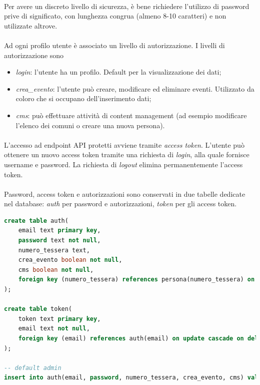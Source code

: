 \documentclass[11pt,a4paper,english]{article}
\begin{document}
\paragraph{} Per avere un discreto livello di sicurezza, è bene richiedere l'utilizzo di password prive di significato, con lunghezza congrua (almeno 8-10 caratteri) e non utilizzate altrove. 

\paragraph{} Ad ogni profilo utente è associato un livello di autorizzazione. I livelli di autorizzazione sono\begin{itemize}
    \item \emph{login}: l'utente ha un profilo. Default per la visualizzazione dei dati;
    \item \emph{crea\_evento}: l'utente può creare, modificare ed eliminare eventi. Utilizzato da coloro che si occupano dell'inserimento dati; 
    \item \emph{cms}: può effettuare attività di content management (ad esempio modificare l'elenco dei comuni o creare una nuova persona). 
\end{itemize}

\paragraph{} L'accesso ad endpoint API protetti avviene tramite \emph{access token}. L'utente può ottenere un nuovo access token tramite una richiesta di \emph{login}, alla quale fornisce username e password. La richiesta di \emph{logout} elimina permanentemente l'access token. 

\paragraph{} Password, access token e autorizzazioni sono conservati in due tabelle dedicate nel database: \emph{auth} per password e autorizzazioni, \emph{token} per gli access token. 

\begin{lstlisting}[language=SQL, caption=tabelle auth e token]
create table auth(
    email text primary key,
    password text not null,
    numero_tessera text,
    crea_evento boolean not null,
    cms boolean not null,
    foreign key (numero_tessera) references persona(numero_tessera) on update cascade on delete cascade
);

create table token(
    token text primary key,
    email text not null,
    foreign key (email) references auth(email) on update cascade on delete cascade
);

-- default admin 
insert into auth(email, password, numero_tessera, crea_evento, cms) values ('admin', 'admin', null, True, True);
\end{lstlisting}
\end{document}
